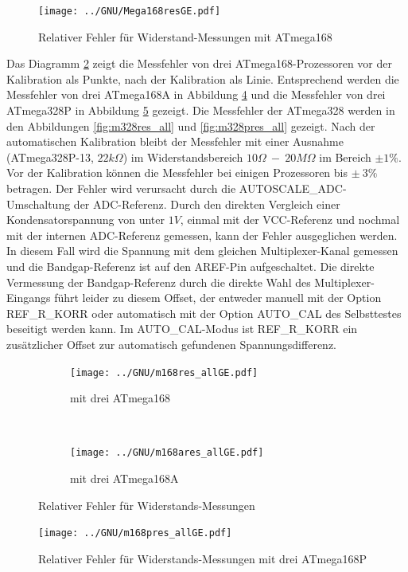\begin{figure}[H]
\centering
\texttt{[image: ../GNU/Mega168resGE.pdf]}
\caption{Relativer Fehler für Widerstand-Messungen mit ATmega168 }
\label{fig:mega168res}
\end{figure}

Das Diagramm \ref{fig:m168res_all} zeigt die Messfehler von drei ATmega168-Prozessoren vor der Kalibration als Punkte, nach der
Kalibration als Linie. Entsprechend werden die Messfehler von drei ATmega168A in Abbildung \ref{fig:m168ares_all} und
die Messfehler von drei ATmega328P in Abbildung \ref{fig:m168pres_all} gezeigt.
Die Messfehler der ATmega328 werden in den Abbildungen \ref{fig:m328res_all} und \ref{fig:m328pres_all} gezeigt.
Nach der automatischen Kalibration bleibt der Messfehler mit einer Ausnahme (ATmega328P-13, \(22k\Omega\)) im Widerstandsbereich
\(10\Omega~-~20M\Omega\) im Bereich \(\pm1\%\).
Vor der Kalibration können die Messfehler bei einigen Prozessoren bis \(\pm~3\%\) betragen.
Der Fehler wird verursacht durch die AUTOSCALE\_ADC-Umschaltung der ADC-Referenz.
Durch den direkten Vergleich einer Kondensatorspannung von unter \(1V\), einmal mit der VCC-Referenz und nochmal mit
der internen ADC-Referenz gemessen, kann der Fehler ausgeglichen werden.
In diesem Fall wird die Spannung mit dem gleichen Multiplexer-Kanal gemessen und die Bandgap-Referenz ist auf den AREF-Pin
aufgeschaltet.
Die direkte Vermessung der Bandgap-Referenz durch die direkte Wahl des Multiplexer-Eingangs führt leider zu diesem Offset,
der entweder manuell mit der Option REF\_R\_KORR oder automatisch mit der Option AUTO\_CAL des Selbsttestes beseitigt werden kann.
Im AUTO\_CAL-Modus ist REF\_R\_KORR ein zusätzlicher Offset zur automatisch gefundenen Spannungsdifferenz.

\begin{figure}[H]
  \begin{subfigure}[b]{.5\textwidth}
    \centering
    \texttt{[image: ../GNU/m168res\_allGE.pdf]}
    \caption{mit drei ATmega168}
    \label{fig:m168res_all}
  \end{subfigure}
  ~
  \begin{subfigure}[b]{.5\textwidth}
    \centering
    \texttt{[image: ../GNU/m168ares\_allGE.pdf]}
    \caption{mit drei ATmega168A}
    \label{fig:m168ares_all}
  \end{subfigure}
\caption{Relativer Fehler für Widerstands-Messungen}
\end{figure}

\begin{figure}[H]
\centering
\texttt{[image: ../GNU/m168pres\_allGE.pdf]}
\caption{Relativer Fehler für Widerstands-Messungen mit drei ATmega168P }
\label{fig:m168pres_all}
\end{figure}

